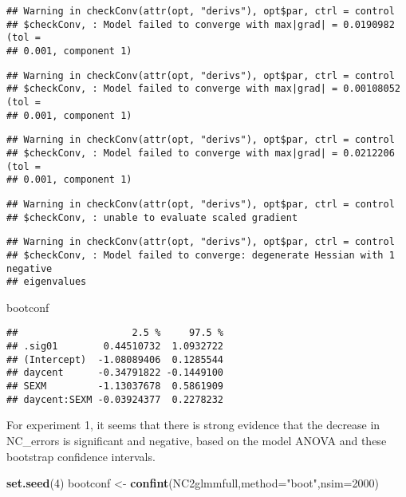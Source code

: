 \documentclass[]{article}
\newenvironment{Shaded}{\begin{snugshade}}{\end{snugshade}}
\newcommand{\KeywordTok}[1]{\textcolor[rgb]{0.13,0.29,0.53}{\textbf{#1}}}
\newcommand{\DataTypeTok}[1]{\textcolor[rgb]{0.13,0.29,0.53}{#1}}
\newcommand{\DecValTok}[1]{\textcolor[rgb]{0.00,0.00,0.81}{#1}}
\newcommand{\StringTok}[1]{\textcolor[rgb]{0.31,0.60,0.02}{#1}}
\newcommand{\NormalTok}[1]{#1}
\begin{document}
\begin{verbatim}
## Warning in checkConv(attr(opt, "derivs"), opt$par, ctrl = control
## $checkConv, : Model failed to converge with max|grad| = 0.0190982 (tol =
## 0.001, component 1)
\end{verbatim}

\begin{verbatim}
## Warning in checkConv(attr(opt, "derivs"), opt$par, ctrl = control
## $checkConv, : Model failed to converge with max|grad| = 0.00108052 (tol =
## 0.001, component 1)
\end{verbatim}

\begin{verbatim}
## Warning in checkConv(attr(opt, "derivs"), opt$par, ctrl = control
## $checkConv, : Model failed to converge with max|grad| = 0.0212206 (tol =
## 0.001, component 1)
\end{verbatim}

\begin{verbatim}
## Warning in checkConv(attr(opt, "derivs"), opt$par, ctrl = control
## $checkConv, : unable to evaluate scaled gradient
\end{verbatim}

\begin{verbatim}
## Warning in checkConv(attr(opt, "derivs"), opt$par, ctrl = control
## $checkConv, : Model failed to converge: degenerate Hessian with 1 negative
## eigenvalues
\end{verbatim}

\begin{Shaded}
\begin{Highlighting}[]
\NormalTok{bootconf}
\end{Highlighting}
\end{Shaded}

\begin{verbatim}
##                    2.5 %     97.5 %
## .sig01        0.44510732  1.0932722
## (Intercept)  -1.08089406  0.1285544
## daycent      -0.34791822 -0.1449100
## SEXM         -1.13037678  0.5861909
## daycent:SEXM -0.03924377  0.2278232
\end{verbatim}

For experiment 1, it seems that there is strong evidence that the
decrease in NC\_errors is significant and negative, based on the model
ANOVA and these bootstrap confidence intervals.

\begin{Shaded}
\begin{Highlighting}[]
\KeywordTok{set.seed}\NormalTok{(}\DecValTok{4}\NormalTok{)}
\NormalTok{bootconf <-}\StringTok{ }\KeywordTok{confint}\NormalTok{(NC2glmmfull,}\DataTypeTok{method=}\StringTok{"boot"}\NormalTok{,}\DataTypeTok{nsim=}\DecValTok{2000}\NormalTok{)}
\end{Highlighting}
\end{Shaded}
\end{document}
